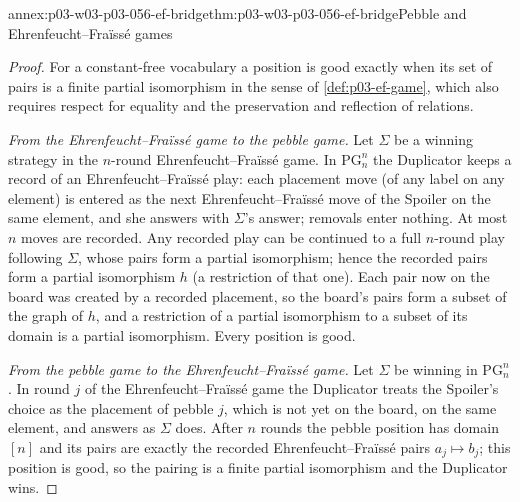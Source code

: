 \begin{annexitem}{annex:p03-w03-p03-056-ef-bridge}{thm:p03-w03-p03-056-ef-bridge}{Pebble and Ehrenfeucht--Fra\"iss\'e games}
\begin{proof}
For a constant-free vocabulary a position is good exactly when its set of
pairs is a finite partial isomorphism in the sense of
\cref{def:p03-ef-game}, which also requires respect for equality and the
preservation and reflection of relations.

\emph{From the Ehrenfeucht--Fra\"iss\'e game to the pebble game.} Let
\(\Sigma\) be a winning strategy in the \(n\)-round
Ehrenfeucht--Fra\"iss\'e game. In \(\mathrm{PG}^n_n\) the Duplicator keeps a
record of an Ehrenfeucht--Fra\"iss\'e play: each placement move (of any
label on any element) is entered as the next Ehrenfeucht--Fra\"iss\'e move
of the Spoiler on the same element, and she answers with \(\Sigma\)'s
answer; removals enter nothing. At most \(n\) moves are recorded. Any
recorded play can be continued to a full \(n\)-round play following
\(\Sigma\), whose pairs form a partial isomorphism; hence the recorded pairs
form a partial isomorphism \(h\) (a restriction of that one). Each pair now
on the board was created by a recorded placement, so the board's pairs form
a subset of the graph of \(h\), and a restriction of a partial isomorphism
to a subset of its domain is a partial isomorphism. Every position is good.

\emph{From the pebble game to the Ehrenfeucht--Fra\"iss\'e game.} Let
\(\Sigma\) be winning in \(\mathrm{PG}^n_n\). In round \(j\) of the
Ehrenfeucht--Fra\"iss\'e game the Duplicator treats the Spoiler's choice as
the placement of pebble \(j\), which is not yet on the board, on the same
element, and answers as \(\Sigma\) does. After \(n\) rounds the pebble
position has domain \([n]\) and its pairs are exactly the recorded
Ehrenfeucht--Fra\"iss\'e pairs \(a_j\mapsto b_j\); this position is good, so
the pairing is a finite partial isomorphism and the Duplicator wins.
\end{proof}
\end{annexitem}
